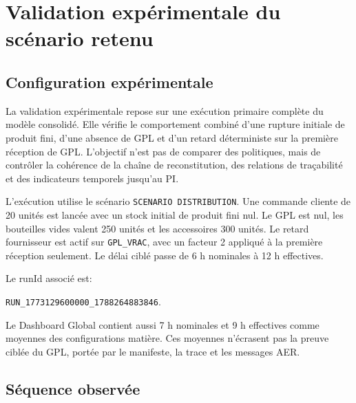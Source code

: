 \chapter{Validation expérimentale du scénario retenu}
\label{chap:validation-scenarios}

\section{Configuration expérimentale}

La validation expérimentale repose sur une exécution primaire complète du modèle consolidé. Elle vérifie le comportement combiné d'une rupture initiale de produit fini, d'une absence de GPL et d'un retard déterministe sur la première réception de GPL. L'objectif n'est pas de comparer des politiques, mais de contrôler la cohérence de la chaîne de reconstitution, des relations de traçabilité et des indicateurs temporels jusqu'au PI.

L'exécution utilise le scénario \texttt{SCENARIO DISTRIBUTION}. Une commande cliente de 20 unités est lancée avec un stock initial de produit fini nul. Le GPL est nul, les bouteilles vides valent 250 unités et les accessoires 300 unités. Le retard fournisseur est actif sur \texttt{GPL\_VRAC}, avec un facteur 2 appliqué à la première réception seulement. Le délai ciblé passe de 6 h nominales à 12 h effectives.

\noindent Le runId associé est:
\begin{center}
\texttt{RUN\_1773129600000\_1788264883846}.
\end{center}

Le Dashboard Global contient aussi 7 h nominales et 9 h effectives comme moyennes des configurations matière. Ces moyennes n'écrasent pas la preuve ciblée du GPL, portée par le manifeste, la trace et les messages AER.

\section{Séquence observée}

